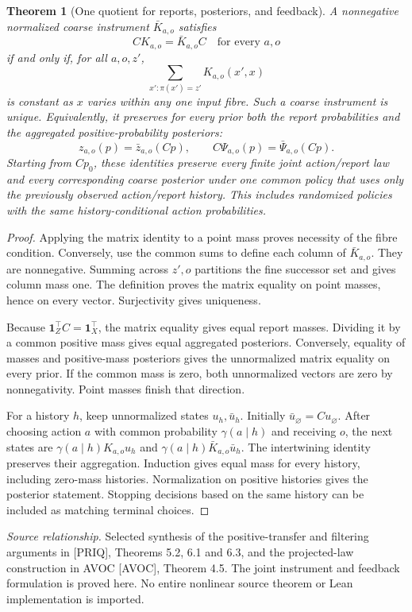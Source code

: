\documentclass[11pt,oneside,openany]{book}
\newtheorem{theorem}{Theorem}[chapter]
\theoremstyle{definition}\newtheorem{definition}[theorem]{Definition}
\newcommand{\source}[1]{\par{\small\textit{Source relationship.} #1}\par}
\begin{document}
\begin{theorem}[One quotient for reports, posteriors, and feedback]\label{r:instrument}
A nonnegative normalized coarse instrument $\bar K_{a,o}$ satisfies
\[
 CK_{a,o}=\bar K_{a,o}C\quad\text{for every }a,o
\]
if and only if, for all $a,o,z'$,
\[
 \sum_{x':\pi(x')=z'}K_{a,o}(x',x)
\]
is constant as $x$ varies within any one input fibre. Such a coarse instrument is unique. Equivalently, it preserves for every prior both the report probabilities and the aggregated positive-probability posteriors:
\[
 z_{a,o}(p)=\bar z_{a,o}(Cp),\qquad C\Psi_{a,o}(p)=\bar\Psi_{a,o}(Cp).
\]
Starting from $Cp_0$, these identities preserve every finite joint action/report law and every corresponding coarse posterior under one common policy that uses only the previously observed action/report history. This includes randomized policies with the same history-conditional action probabilities.
\end{theorem}
\begin{proof}
Applying the matrix identity to a point mass proves necessity of the fibre condition. Conversely, use the common sums to define each column of $\bar K_{a,o}$. They are nonnegative. Summing across $z',o$ partitions the fine successor set and gives column mass one. The definition proves the matrix equality on point masses, hence on every vector. Surjectivity gives uniqueness.

Because $\mathbf1_Z^\top C=\mathbf1_X^\top$, the matrix equality gives equal report masses. Dividing it by a common positive mass gives equal aggregated posteriors. Conversely, equality of masses and positive-mass posteriors gives the unnormalized matrix equality on every prior. If the common mass is zero, both unnormalized vectors are zero by nonnegativity. Point masses finish that direction.

For a history $h$, keep unnormalized states $u_h,\bar u_h$. Initially $\bar u_\varnothing=Cu_\varnothing$. After choosing action $a$ with common probability $\gamma(a\mid h)$ and receiving $o$, the next states are $\gamma(a\mid h)K_{a,o}u_h$ and $\gamma(a\mid h)\bar K_{a,o}\bar u_h$. The intertwining identity preserves their aggregation. Induction gives equal mass for every history, including zero-mass histories. Normalization on positive histories gives the posterior statement. Stopping decisions based on the same history can be included as matching terminal choices.
\end{proof}
\source{Selected synthesis of the positive-transfer and filtering arguments in [PRIQ], Theorems 5.2, 6.1 and 6.3, and the projected-law construction in AVOC [AVOC], Theorem 4.5. The joint instrument and feedback formulation is proved here. No entire nonlinear source theorem or Lean implementation is imported.}
\end{document}
